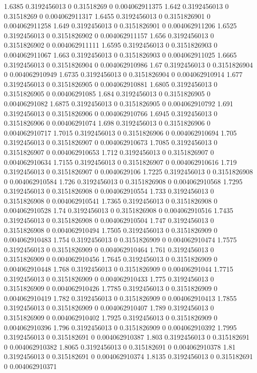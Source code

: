 {1.6385 0.3192456013 0 0.31518269 0 0.004062911375
1.642 0.3192456013 0 0.31518269 0 0.004062911317
1.6455 0.3192456013 0 0.3151826901 0 0.004062911258
1.649 0.3192456013 0 0.3151826901 0 0.004062911206
1.6525 0.3192456013 0 0.3151826902 0 0.004062911157
1.656 0.3192456013 0 0.3151826902 0 0.004062911111
1.6595 0.3192456013 0 0.3151826903 0 0.004062911067
1.663 0.3192456013 0 0.3151826903 0 0.004062911025
1.6665 0.3192456013 0 0.3151826904 0 0.004062910986
1.67 0.3192456013 0 0.3151826904 0 0.004062910949
1.6735 0.3192456013 0 0.3151826904 0 0.004062910914
1.677 0.3192456013 0 0.3151826905 0 0.004062910881
1.6805 0.3192456013 0 0.3151826905 0 0.00406291085
1.684 0.3192456013 0 0.3151826905 0 0.00406291082
1.6875 0.3192456013 0 0.3151826905 0 0.004062910792
1.691 0.3192456013 0 0.3151826906 0 0.004062910766
1.6945 0.3192456013 0 0.3151826906 0 0.00406291074
1.698 0.3192456013 0 0.3151826906 0 0.004062910717
1.7015 0.3192456013 0 0.3151826906 0 0.004062910694
1.705 0.3192456013 0 0.3151826907 0 0.004062910673
1.7085 0.3192456013 0 0.3151826907 0 0.004062910653
1.712 0.3192456013 0 0.3151826907 0 0.004062910634
1.7155 0.3192456013 0 0.3151826907 0 0.004062910616
1.719 0.3192456013 0 0.3151826907 0 0.0040629106
1.7225 0.3192456013 0 0.3151826908 0 0.004062910584
1.726 0.3192456013 0 0.3151826908 0 0.004062910568
1.7295 0.3192456013 0 0.3151826908 0 0.004062910554
1.733 0.3192456013 0 0.3151826908 0 0.004062910541
1.7365 0.3192456013 0 0.3151826908 0 0.004062910528
1.74 0.3192456013 0 0.3151826908 0 0.004062910516
1.7435 0.3192456013 0 0.3151826908 0 0.004062910504
1.747 0.3192456013 0 0.3151826908 0 0.004062910494
1.7505 0.3192456013 0 0.3151826909 0 0.004062910483
1.754 0.3192456013 0 0.3151826909 0 0.004062910474
1.7575 0.3192456013 0 0.3151826909 0 0.004062910464
1.761 0.3192456013 0 0.3151826909 0 0.004062910456
1.7645 0.3192456013 0 0.3151826909 0 0.004062910448
1.768 0.3192456013 0 0.3151826909 0 0.00406291044
1.7715 0.3192456013 0 0.3151826909 0 0.004062910433
1.775 0.3192456013 0 0.3151826909 0 0.004062910426
1.7785 0.3192456013 0 0.3151826909 0 0.004062910419
1.782 0.3192456013 0 0.3151826909 0 0.004062910413
1.7855 0.3192456013 0 0.3151826909 0 0.004062910407
1.789 0.3192456013 0 0.3151826909 0 0.004062910402
1.7925 0.3192456013 0 0.3151826909 0 0.004062910396
1.796 0.3192456013 0 0.3151826909 0 0.004062910392
1.7995 0.3192456013 0 0.315182691 0 0.004062910387
1.803 0.3192456013 0 0.315182691 0 0.004062910382
1.8065 0.3192456013 0 0.315182691 0 0.004062910378
1.81 0.3192456013 0 0.315182691 0 0.004062910374
1.8135 0.3192456013 0 0.315182691 0 0.004062910371
}
